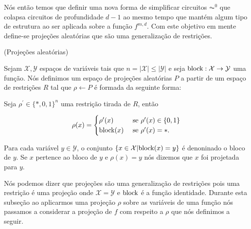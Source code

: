Nós então temos que definir uma nova forma de simplificar circuitos $\AC^{0}$ que colapsa circuitos de profundidade $d - 1$ ao mesmo tempo que mantém algum tipo de estrutura ao ser aplicada sobre a função $f^{m, d}$. Com este objetivo em mente define-se projeções aleatórias que são uma generalização de restrições.

\begin{defi} (Projeções aleatórias) \label{projections}
 
 Sejam $\mathcal{X}, \mathcal{Y}$ espaços de variáveis tais que $n = \lvert \mathcal{X} \rvert \leq \lvert \mathcal{Y} \rvert$ e seja $\text{block}: \mathcal{X} \to \mathcal{Y}$ uma função. Nós definimos um espaço de projeções aleatórias $P$ a partir de um espaço de restrições $R$ tal que $\rho \leftarrow P$ é formada da seguinte forma:
 
 Seja $\rho^{\prime} \in \{*, 0, 1\}^{n}$ uma restrição tirada de $R$, então
 
 \begin{equation*}
 	\rho(x) = \begin{cases}
 	                	\rho^{\prime}(x) & \text{ se } \rho^{\prime}(x) \in \{0, 1\} \\
 	                	\text{block}(x) & \text{ se } \rho^{\prime}(x) = *.
 	                \end{cases}
 \end{equation*}

 Para cada variável $y \in \mathcal{Y}$, o conjunto $\{x \in \mathcal{X} \lvert \text{block}(x) = y \}$ é denoninado o bloco de $y$. Se $x$ pertence ao bloco de $y$ e $\rho(x) = y$ nós dizemos que $x$ foi projetada para $y$.

\end{defi} 

Nós podemos dizer que projeções são uma generalização de restrições pois uma restrição é uma projeção onde $\mathcal{X} = \mathcal{Y}$ e $\text{block}$ é a função identidade. Durante esta subseção ao aplicarmos uma projeção $\rho$ sobre as variáveis de uma função nós passamos a considerar a projeção de $f$ com respeito a $\rho$ que nós definimos a seguir.

